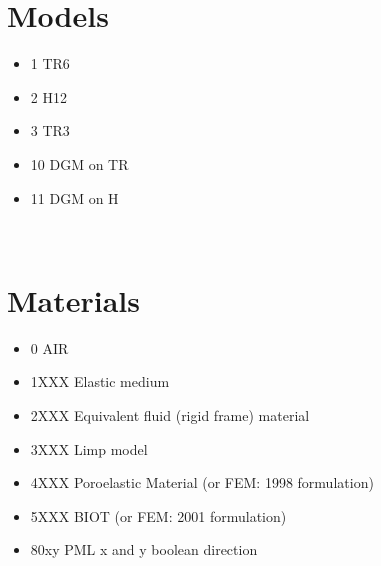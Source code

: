 \documentclass[a4paper, 13pt]{article}
\begin{document}
\vfill

\begin{minipage}{0.3\textwidth}
\section{Models}
\begin{itemize}
\item 1 TR6
\item 2 H12
\item 3 TR3
\item 10 DGM on TR
\item 11 DGM on H
\end{itemize}
\end{minipage}~%
\begin{minipage}{0.68\textwidth}
\section{Materials}
\begin{itemize}
\item 0 AIR
\item 1XXX Elastic medium
\item 2XXX Equivalent fluid (rigid frame) material
\item 3XXX Limp model
\item 4XXX Poroelastic Material (or FEM: 1998 formulation)
\item 5XXX BIOT (or FEM: 2001 formulation) 
\item 80xy PML x and y boolean direction
\end{itemize}
\end{minipage}

\vspace{1cm}
\end{document}
